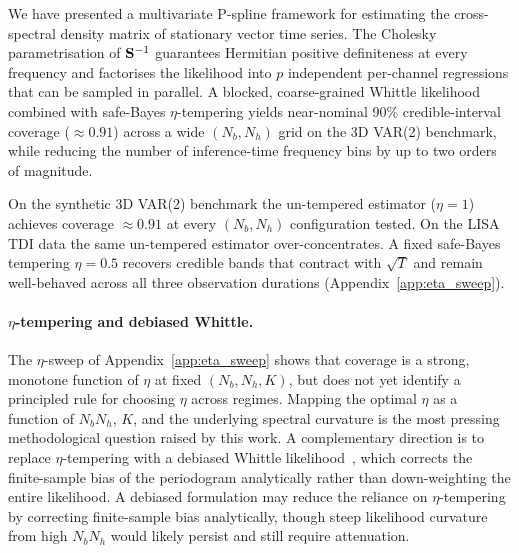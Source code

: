 \documentclass[%
	reprint,
	nofootinbib,
	amsmath,
	amssymb,
	aps,
]{revtex4-2}
\begin{document}
	We have presented a multivariate P-spline framework for estimating the
	cross-spectral density matrix of stationary vector time series. The
	Cholesky parametrisation of $\S^{-1}$ guarantees Hermitian positive
	definiteness at every frequency and factorises the likelihood into $p$
	independent per-channel regressions that can be sampled in parallel.
	A blocked, coarse-grained Whittle likelihood combined with safe-Bayes
	$\eta$-tempering yields near-nominal 90\% credible-interval coverage
	($\approx 0.91$) across a wide $(N_{b},N_{h})$ grid on the 3D VAR(2)
	benchmark, while reducing the number of inference-time frequency bins by
	up to two orders of magnitude.

	On the synthetic 3D VAR(2) benchmark the un-tempered estimator
	($\eta=1$) achieves coverage $\approx\!0.91$ at every $(N_{b},N_{h})$
	configuration tested. On the LISA TDI data the same un-tempered
	estimator over-concentrates. A fixed safe-Bayes tempering $\eta=0.5$
	recovers credible bands that contract with $\sqrt{T}$ and remain
	well-behaved across all three observation durations
	(Appendix~\ref{app:eta_sweep}).

	\paragraph{$\eta$-tempering and debiased Whittle.}
	The $\eta$-sweep of Appendix~\ref{app:eta_sweep} shows that coverage
	is a strong, monotone function of $\eta$ at fixed
	$(N_{b},N_{h},K)$, but does not yet identify a principled rule for
	choosing $\eta$ across regimes. Mapping the optimal $\eta$ as a
	function of $N_{b}N_{h}$, $K$, and the underlying spectral curvature
	is the most pressing methodological question raised by this work.
	A complementary direction is to replace $\eta$-tempering with a
	debiased Whittle likelihood~\citep{sykulski2019_debiased}, which
	corrects the finite-sample bias of the periodogram analytically
	rather than down-weighting the entire likelihood. A debiased
	formulation may reduce the reliance on $\eta$-tempering by correcting
	finite-sample bias analytically, though steep likelihood curvature
	from high $N_b N_h$ would likely persist and still require attenuation.
\end{document}
